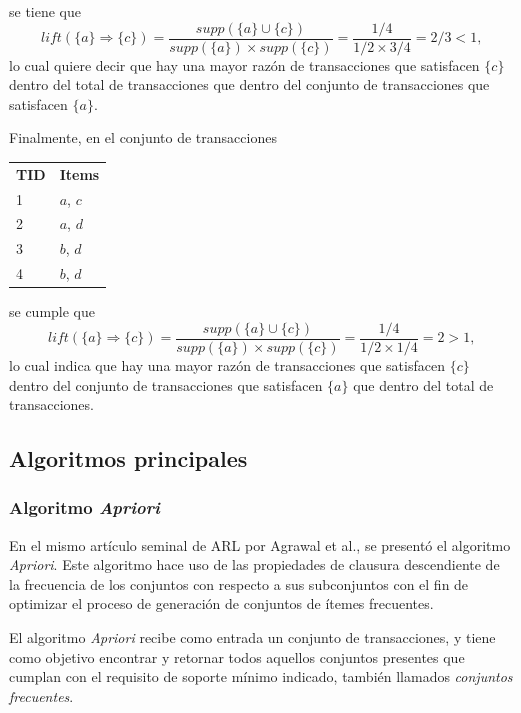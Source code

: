 se tiene que $$\mathit{lift}(\{a\} \Rightarrow \{c\}) = \frac{\mathit{supp}(\{a\} \cup \{c\})}{\mathit{supp}(\{a\}) \times \mathit{supp}(\{c\})} = \frac{1/4}{1/2 \times 3/4} = 2/3 < 1\text{,}$$ lo cual quiere decir que hay una mayor razón de transacciones que satisfacen $\{c\}$ dentro del total de transacciones que dentro del conjunto de transacciones que satisfacen $\{a\}$.

Finalmente, en el conjunto de transacciones

\begin{tabular}{l l}
\textbf{TID} & \textbf{Items} \\
1 & $a$, $c$ \\
2 & $a$, $d$ \\
3 & $b$, $d$ \\
4 & $b$, $d$ \\
\end{tabular}

se cumple que $$\mathit{lift}(\{a\} \Rightarrow \{c\}) = \frac{\mathit{supp}(\{a\} \cup \{c\})}{\mathit{supp}(\{a\}) \times \mathit{supp}(\{c\})} = \frac{1/4}{1/2 \times 1/4} = 2 > 1\text{,}$$ lo cual indica que hay una mayor razón de transacciones que satisfacen $\{c\}$ dentro del conjunto de transacciones que satisfacen $\{a\}$ que dentro del total de transacciones.

\subsection{Algoritmos principales}

\subsubsection{Algoritmo \textit{Apriori}}

En el mismo artículo seminal de ARL por Agrawal et al.\cite{agrawal1993mining}, se presentó el algoritmo \textit{Apriori}. Este algoritmo hace uso de las propiedades de clausura descendiente de la frecuencia de los conjuntos con respecto a sus subconjuntos con el fin de optimizar el proceso de generación de conjuntos de ítemes frecuentes.

El algoritmo \textit{Apriori} recibe como entrada un conjunto de transacciones, y tiene como objetivo encontrar y retornar todos aquellos conjuntos presentes que cumplan con el requisito de soporte mínimo indicado, también llamados \textit{conjuntos frecuentes}.

